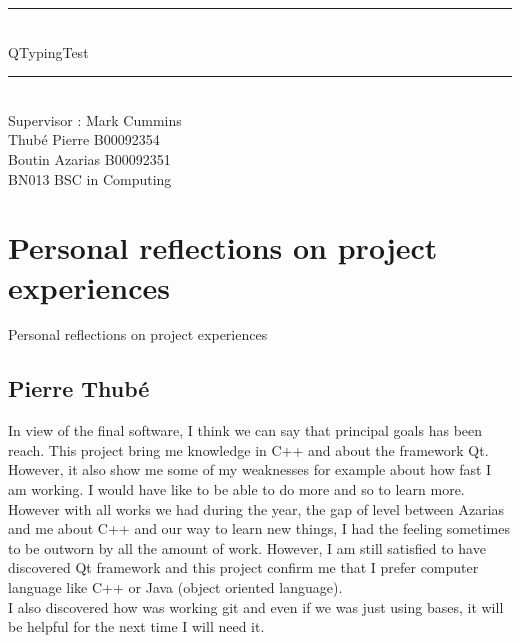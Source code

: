 \documentclass[11pt]{report}
\newcommand{\Mline}{\hrule \mbox{}\\[0.1cm]}
\begin{document}
\begin{titlepage}
\begin{center}


\Mline
{ \LARGE QTypingTest \\[0.4cm] }
\Mline

Supervisor : Mark Cummins\\[3cm]

Thubé Pierre B00092354\\
Boutin Azarias B00092351\\[2cm]
BN013 BSC in Computing

\end{center}
\end{titlepage}

\setcounter{page}{2}

\tableofcontents







\part{Personal reflections on project experiences}
Personal reflections on project experiences

\chapter{Pierre Thubé}
In view of the final software, I think we can say that principal goals has been reach. This project bring me knowledge in C++ and about the framework Qt. However, it also show me some of my weaknesses for example about how fast I am working. I would have like to be able to do more and so to learn more. However with all works we had during the year, the gap of level between Azarias and me about C++ and our way to learn new things, I had the feeling sometimes to be outworn by all the amount of work. However, I am still satisfied to have discovered Qt framework and this project confirm me that I prefer computer language like C++ or Java (object oriented language).\\
I also discovered how was working git and even if we was just using bases, it will be helpful for the next time I will need it. 
\end{document}
